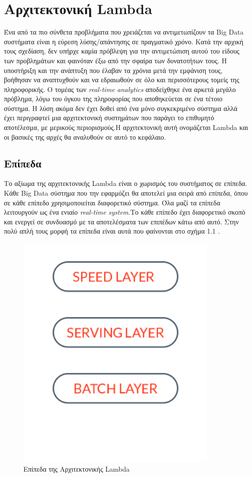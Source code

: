 \chapter{Αρχιτεκτονική Lambda}
Ένα από τα πιο σύνθετα προβλήματα που χρειάζεται να αντιμετωπίζουν τα Big Data συστήματα είναι η εύρεση λύσης/απάντησης σε πραγματικό χρόνο. Κατά την αρχική τους σχεδίαση, δεν υπήρχε καμία πρόβλεψη για την αντιμετώπιση αυτού του είδους των προβλημάτων και φαινόταν έξω από την σφαίρα των δυνατοτήτων τους. Η υποστήριξη και την ανάπτυξη που έλαβαν τα χρόνια μετά την εμφάνιση τους, βοήθησαν να αναπτυχθούν και να εδραιωθούν σε όλο και περισσότερους τομείς της πληροφορικής. Ο τομέας των \textit{real-time analytics} αποδείχθηκε ένα αρκετά μεγάλο πρόβλημα, λόγω του όγκου της πληροφορίας που αποθηκεύεται σε ένα τέτοιο σύστημα. Η λύση ακόμα δεν έχει δοθεί από ένα μόνο συγκεκριμένο σύστημα αλλά έχει περιγραφτεί μια αρχιτεκτονική συστημάτων που παράγει το επιθυμητό αποτέλεσμα, με μερικούς περιορισμούς.Η αρχιτεκτονική αυτή ονομάζεται Lambda και οι βασικές της αρχές θα αναλυθούν σε αυτό το κεφάλαιο.

\section{Επίπεδα}
Το αξίωμα της αρχιτεκτονικής Lambda είναι ο χωρισμός του συστήματος σε επίπεδα. Κάθε Big Data σύστημα που την εφαρμόζει θα αποτελεί μια σειρά από επίπεδα, όπου σε κάθε επίπεδο χρησιμοποιείται διαφορετικό σύστημα. Όλα μαζί τα επίπεδα λειτουργούν ως ένα ενιαίο \textit{real-time system}.Το κάθε επίπεδο έχει διαφορετικό σκοπό και ενεργεί σε συνδυασμό με τα αποτελέσματα των επιπέδων κάτω από αυτό. Στην πολύ απλή τους μορφή τα επίπεδα είναι αυτά που φαίνονται στο σχήμα 1.1 .

\begin{figure}[t]
\caption{Επίπεδα της Αρχιτεκτονικής Lambda}
\includegraphics[width=10cm]{images/layers.png}
\centering
\end{figure}
\clearpage

